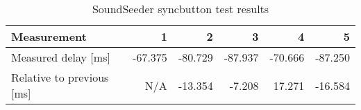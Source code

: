 \begin{table}[h]
\centering
\begin{tabular}{|l|r|r|r|r|r|}
\hline
Measurement          		& 1       & 2       & 3       & 4       & 5       \\ \hline
Measured delay [ms]       	& -67.375 & -80.729 & -87.937 & -70.666 & -87.250 \\ \hline
Relative to previous [ms] 	& N/A     & -13.354 & -7.208  & 17.271  & -16.584  \\ \hline
\end{tabular}
\caption{SoundSeeder syncbutton test results}
\label{fig:soundseedersyncbutton}
\end{table}

